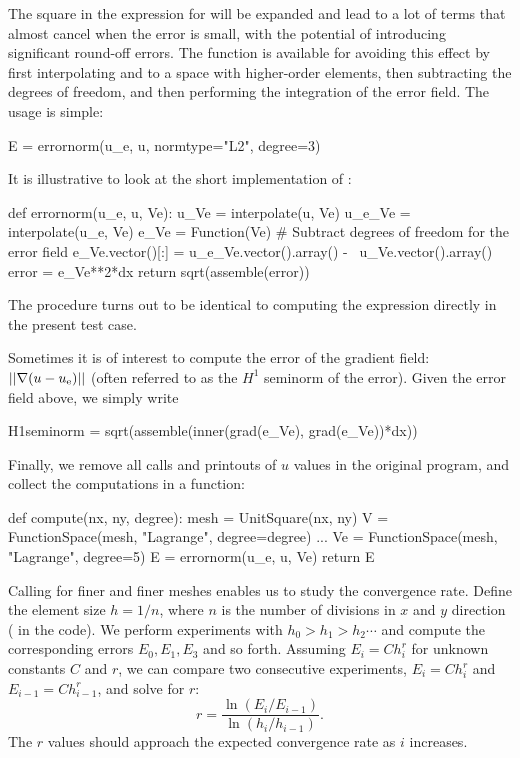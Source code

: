 The square in the expression for  will be expanded and lead
to a lot of terms that almost cancel when the error is small, with the
potential of introducing significant round-off errors.  The function
 is available for avoiding this effect by first
interpolating  and  to a space with higher-order
elements, then subtracting the degrees of freedom, and then performing
the integration of the error field. The usage is simple:
\begin{python}
E = errornorm(u_e, u, normtype="L2", degree=3)
\end{python}
It is illustrative to look at the short implementation of :
\begin{python}
def errornorm(u_e, u, Ve):
    u_Ve = interpolate(u, Ve)
    u_e_Ve = interpolate(u_e, Ve)
    e_Ve = Function(Ve)
    # Subtract degrees of freedom for the error field
    e_Ve.vector()[:] = u_e_Ve.vector().array() - \
                       u_Ve.vector().array()
    error = e_Ve**2*dx
    return sqrt(assemble(error))
\end{python}
The  procedure turns out to be identical to computing
the expression \emp{(u\_e - u)**2*dx} directly in the present test case.

Sometimes it is of interest to compute the error of the gradient field:
$||\nabla (u-u_{\rm e})||$ (often referred to as the $H^1$ seminorm of the
error).  Given the error field \emp{e\_Ve} above, we simply write
\begin{python}
H1seminorm = sqrt(assemble(inner(grad(e_Ve), grad(e_Ve))*dx))
\end{python}

\clearpage

Finally, we remove all  calls and printouts of $u$ values in
the original program, and collect the computations in a function:
\begin{python}
def compute(nx, ny, degree):
    mesh = UnitSquare(nx, ny)
    V = FunctionSpace(mesh, "Lagrange", degree=degree)
    ...
    Ve = FunctionSpace(mesh, "Lagrange", degree=5)
    E = errornorm(u_e, u, Ve)
    return E
\end{python}

Calling  for finer and finer meshes enables us to study
the convergence rate. Define the element size $h=1/n$, where $n$ is the
number of divisions in $x$ and $y$ direction (\emp{nx=ny} in the code). We
perform experiments with $h_0>h_1>h_2\cdots$ and compute the corresponding
errors $E_0, E_1, E_3$ and so forth.  Assuming $E_i=Ch_i^r$ for unknown
constants $C$ and $r$, we can compare two consecutive experiments,
$E_i=Ch_i^r$ and $E_{i-1}=Ch_{i-1}^r$, and solve for $r$:
\begin{equation}
  r = \frac{\ln(E_i/E_{i-1})}{\ln (h_i/h_{i-1})}.
\end{equation}
The $r$ values should approach the expected convergence rate
 as $i$ increases.

